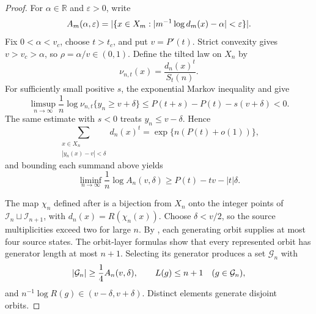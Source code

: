 \begin{proof}
For \(\alpha\in\mathbb R\) and \(\varepsilon>0\), write
\[
 A_m(\alpha,\varepsilon)=\lvert \{x\in X_m:
 |m^{-1}\log d_m(x)-\alpha|<\varepsilon\} \rvert.
\]
Fix \(0<\alpha<v_c\), choose \(t>t_c\), and put \(v=P'(t)\).  Strict
convexity gives \(v>v_c>\alpha\), so \(\rho=\alpha/v\in(0,1)\).  Define
the tilted law on \(X_n\) by
\[
 \nu_{n,t}(x)=\frac{d_n(x)^t}{S_t(n)}.
\]
For sufficiently small positive \(s\), the exponential Markov inequality and
 give
\[
 \limsup_{n\to\infty}\frac1n
 \log\nu_{n,t}\{y_n\ge v+\delta\}
 \le P(t+s)-P(t)-s(v+\delta)<0.
\]
The same estimate with \(s<0\) treats \(y_n\le v-\delta\).  Hence
\[
 \sum_{\substack{x\in X_n\\|y_n(x)-v|<\delta}}d_n(x)^t
 =\exp\{n(P(t)+o(1))\},
\]
and bounding each summand above yields
\begin{equation}
 \liminf_{n\to\infty}\frac1n\log A_n(v,\delta)
 \ge P(t)-tv-|t|\delta.
 \label{eq:exposed-source-count}
\end{equation}

The map \(\chi_n\) defined after
 is a bijection from \(X_n\) onto the
integer points of
\(\mathcal I_n\sqcup\mathcal I_{n+1}\), with
\(d_n(x)=R(\chi_n(x))\).  Choose \(\delta<v/2\), so the source
multiplicities exceed two for large \(n\).  By
, each generating orbit supplies at most four
source states.  The orbit-layer formulas show that every represented orbit
has generator length at most \(n+1\).  Selecting its generator produces a
set \(\mathcal G_n\) with
\begin{equation}
 \lvert \mathcal G_n \rvert\ge\frac14A_n(v,\delta),
 \qquad L(g)\le n+1\quad(g\in\mathcal G_n),
 \label{eq:source-generating-orbits}
\end{equation}
and \(n^{-1}\log R(g)\in(v-\delta,v+\delta)\).  Distinct elements generate
disjoint orbits.


\end{proof}
